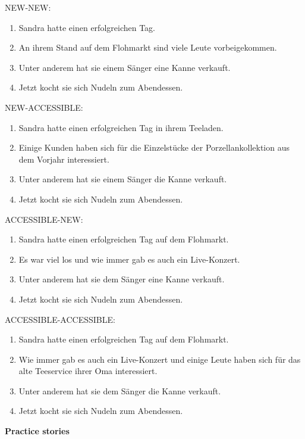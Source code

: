 NEW-NEW:

\begin{enumerate}
\item Sandra hatte einen erfolgreichen Tag.
\item An ihrem Stand auf dem Flohmarkt sind viele Leute vorbeigekommen.
\item Unter anderem hat sie einem Sänger eine Kanne verkauft.
\item Jetzt kocht sie sich Nudeln zum Abendessen.
\end{enumerate}

NEW-ACCESSIBLE:

\begin{enumerate}
\item Sandra hatte einen erfolgreichen Tag in ihrem Teeladen.
\item Einige Kunden haben sich für die Einzelstücke der Porzellankollektion aus dem Vorjahr interessiert.
\item Unter anderem hat sie einem Sänger die Kanne verkauft.
\item Jetzt kocht sie sich Nudeln zum Abendessen.
\end{enumerate}

ACCESSIBLE-NEW:

\begin{enumerate}
\item Sandra hatte einen erfolgreichen Tag auf dem Flohmarkt.
\item Es war viel los und wie immer gab es auch ein Live-Konzert. 
\item Unter anderem hat sie dem Sänger eine Kanne verkauft.
\item Jetzt kocht sie sich Nudeln zum Abendessen.
\end{enumerate}

ACCESSIBLE-ACCESSIBLE:

\begin{enumerate}
\item Sandra hatte einen erfolgreichen Tag auf dem Flohmarkt. 
\item Wie immer gab es auch ein Live-Konzert und einige Leute haben sich für das alte Teeservice ihrer Oma interessiert.
\item Unter anderem hat sie dem Sänger die Kanne verkauft.
\item Jetzt kocht sie sich Nudeln zum Abendessen.
\end{enumerate}

\textbf{Practice stories}\\

